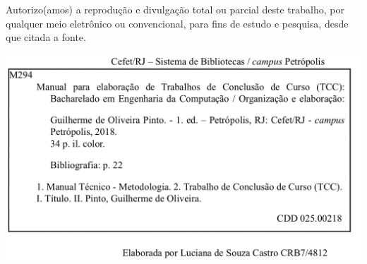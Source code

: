 \newpage
\begin{minipage}{0.9\textwidth}

{\normalsize 
\begin{center}
Autorizo(amos) a reprodução e divulgação total ou parcial deste trabalho, por qualquer meio
eletrônico ou convencional, para fins de estudo e pesquisa, desde que citada a fonte.
\end{center}
\vspace*{0.5cm}
}
\end{minipage}
\vspace*{5cm}
\begin{center}
\includegraphics[height=0.4\textwidth]{Figs/biblioteca_engcomp.jpeg} 
\end{center}







\newpage
\newcommand{\HRule}{\rule{0.6\linewidth}{0.5mm}}
\pagestyle{empty}

